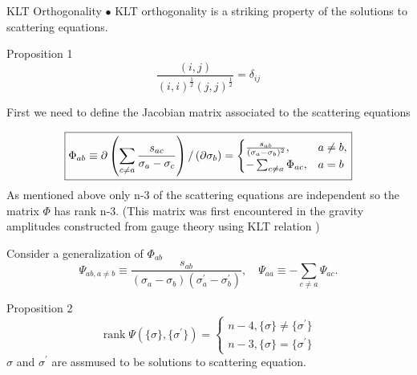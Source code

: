\documentclass{beamer}
\begin{document}
\appendix
\begin{frame}{KLT Orthogonality}
    $\bullet$ KLT orthogonality is a striking property of the solutions to scattering equations.
    \begin{block}{Proposition 1}
        \begin{equation*}
            \frac{(i,j)}{(i,i)^{\frac12}(j,j)^{\frac12}}=\delta_{ij}
        \end{equation*}
    \end{block}
    
\end{frame}
\begin{frame}
    First we need to define the Jacobian matrix associated to the scattering equations
        
        \begin{equation*}
            \boxed{
            \label{jacobbi}
            \Phi_{ab}\equiv\partial\left(\sum_{c\neq a}\frac{s_{ac}}{\sigma_a-\sigma_c}\right)/\left(\partial\sigma_b\right)=\begin{cases}\frac{s_{ab}}{(\sigma_a-\sigma_b)^2},&a\neq b,\\-\sum_{c\neq a}\Phi_{ac}, &a=b\end{cases}
            }
        \end{equation*}
    As mentioned above only n-3 of the scattering equations are independent so the matrix $\Phi$ has \alert{rank n-3}.  (This matrix was first encountered in the gravity amplitudes constructed from gauge theory using KLT relation ) 
\end{frame}
\begin{frame}
    Consider a generalization of $\Phi_{ab}$ 
    \begin{equation*}
        \Psi_{ab,a\neq b}\equiv\frac{s_{ab}}{(\sigma_a-\sigma_b)(\sigma_a^{\prime}-\sigma_b^{\prime})},\quad\Psi_{aa}\equiv-\sum_{c\neq a}\Psi_{ac}.
    \end{equation*}
    \begin{block}{Proposition 2}
        \begin{equation*}
            \operatorname{rank}\Psi(\{\sigma\},\{\sigma^{\prime}\})=\begin{cases}n-4, \{\sigma\}\neq\{\sigma^{\prime}\}\\n-3, \{\sigma\}=\{\sigma^{\prime}\}\end{cases}
        \end{equation*}
        $\sigma$ and $\sigma^\prime$ are assmused to be solutions to scattering equation.
    \end{block}
\end{frame}
\end{document}
